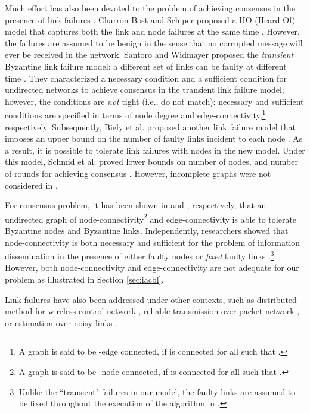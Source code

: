 \documentclass{llncs}
\begin{document}
Much effort has also been devoted to the problem of achieving consensus in the presence of link failures \cite{HeardOf,Biely_hybrid,Schmid_link,Santoro_link,Santoro_link2}. Charron-Bost and Schiper proposed a HO (Heard-Of) model that captures both the link and node failures at the same time \cite{HeardOf}. However, the failures are assumed to be benign in the sense that no corrupted message will ever be received in the network. Santoro and Widmayer proposed the {\em transient} Byzantine link failure model: a different set of links can be faulty at different time \cite{Santoro_link,Santoro_link2}. They characterized a necessary condition and a sufficient condition for undirected networks to achieve consensus in the transient link failure model; however, the conditions are {\em not} tight (i.e., do not match): necessary and sufficient conditions are specified in terms of node degree and edge-connectivity,\footnote{A graph  is said to be -edge connected, if  is connected for all  such that .} respectively. Subsequently, Biely et al. proposed another link failure model that imposes an upper bound on the number of faulty links incident to each node \cite{Biely_hybrid}. As a result, it is possible to tolerate  link failures with  nodes in the new model. Under this model, Schmid et al. proved lower bounds on number of nodes, and number of rounds for achieving consensus \cite{Schmid_link}. However, incomplete graphs were not considered in \cite{Biely_hybrid,Schmid_link}.

For consensus problem, it has been shown in \cite{impossible} and \cite{Santoro_link2}, respectively, that an undirected graph of  node-connectivity\footnote{A graph  is said to be -node connected, if  is connected for all  such that .} and edge-connectivity is able to tolerate  Byzantine nodes and  Byzantine links. Independently, researchers showed that  node-connectivity is both necessary and sufficient for the problem of information dissemination in the presence of either  faulty nodes \cite{SS_node} or  {\em fixed} faulty links \cite{SS_link}.\footnote{Unlike the ``transient" failures in our model, the faulty links are assumed to be fixed throughout the execution of the algorithm in \cite{SS_link}.} However, both node-connectivity and edge-connectivity are not adequate for our problem as illustrated in Section \ref{sec:iacbl}. 

Link failures have also been addressed under other contexts, such as distributed method for wireless control network \cite{control}, reliable transmission over packet network \cite{packet}, or estimation over noisy links \cite{noisy_link}.
\end{document}
